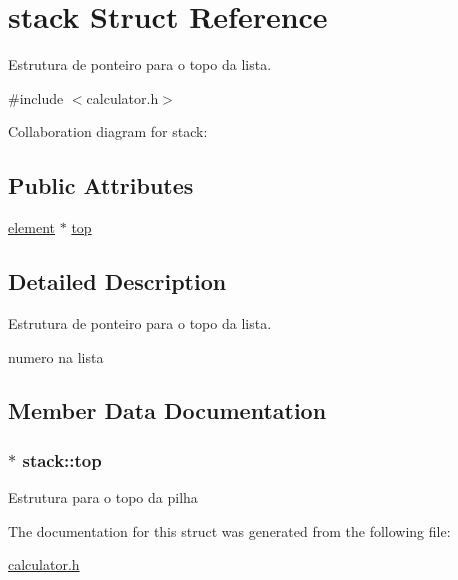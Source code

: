 \hypertarget{structstack}{}\section{stack Struct Reference}
\label{structstack}


Estrutura de ponteiro para o topo da lista.  




{\ttfamily \#include $<$calculator.\+h$>$}



Collaboration diagram for stack\+:
\subsection*{Public Attributes}
\begin{DoxyCompactItemize}
\item 
\hyperlink{calculator_8h_a5784e30e041ff09d82d31df74e9ae133}{element} $\ast$ \hyperlink{structstack_acf625028343edca568b771976bf950ef}{top}
\end{DoxyCompactItemize}


\subsection{Detailed Description}
Estrutura de ponteiro para o topo da lista. 

numero na lista 

\subsection{Member Data Documentation}
\subsubsection[{\texorpdfstring{top}{top}}]{$\ast$ stack\+::top}\hypertarget{structstack_acf625028343edca568b771976bf950ef}{}\label{structstack_acf625028343edca568b771976bf950ef}
Estrutura para o topo da pilha 

The documentation for this struct was generated from the following file\+:\begin{DoxyCompactItemize}
\item 
\hyperlink{calculator_8h}{calculator.\+h}\end{DoxyCompactItemize}
